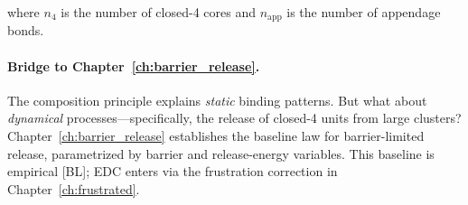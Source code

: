 where $n_4$ is the number of closed-4 cores and $n_{\text{app}}$ is the
number of appendage bonds.

\paragraph{Bridge to Chapter~\ref{ch:barrier_release}.}
The composition principle explains \emph{static} binding patterns. But
what about \emph{dynamical} processes---specifically, the release of closed-4
units from large clusters? Chapter~\ref{ch:barrier_release} establishes
the baseline law for barrier-limited release, parametrized by barrier and
release-energy variables. This baseline is empirical [BL]; EDC enters via
the frustration correction in Chapter~\ref{ch:frustrated}.


